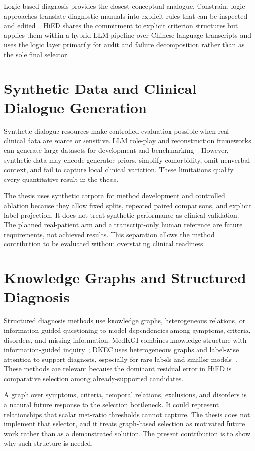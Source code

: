 Logic-based diagnosis provides the closest conceptual analogue. Constraint-logic approaches translate diagnostic manuals into explicit rules that can be inspected and edited~\citep{kim2025clp}. HiED shares the commitment to explicit criterion structures but applies them within a hybrid LLM pipeline over Chinese-language transcripts and uses the logic layer primarily for audit and failure decomposition rather than as the sole final selector.

\section{Synthetic Data and Clinical Dialogue Generation}

Synthetic dialogue resources make controlled evaluation possible when real clinical data are scarce or sensitive. LLM role-play and reconstruction frameworks can generate large datasets for development and benchmarking~\citep{wu2024callm}. However, synthetic data may encode generator priors, simplify comorbidity, omit nonverbal context, and fail to capture local clinical variation. These limitations qualify every quantitative result in the thesis.

The thesis uses synthetic corpora for method development and controlled ablation because they allow fixed splits, repeated paired comparisons, and explicit label projection. It does not treat synthetic performance as clinical validation. The planned real-patient arm and a transcript-only human reference are future requirements, not achieved results. This separation allows the method contribution to be evaluated without overstating clinical readiness.

\section{Knowledge Graphs and Structured Diagnosis}

Structured diagnosis methods use knowledge graphs, heterogeneous relations, or information-guided questioning to model dependencies among symptoms, criteria, disorders, and missing information. MedKGI combines knowledge structure with information-guided inquiry~\citep{wang2025medkgi}; DKEC uses heterogeneous graphs and label-wise attention to support diagnosis, especially for rare labels and smaller models~\citep{ge2024dkec}. These methods are relevant because the dominant residual error in HiED is comparative selection among already-supported candidates.

A graph over symptoms, criteria, temporal relations, exclusions, and disorders is a natural future response to the selection bottleneck. It could represent relationships that scalar met-ratio thresholds cannot capture. The thesis does not implement that selector, and it treats graph-based selection as motivated future work rather than as a demonstrated solution. The present contribution is to show why such structure is needed.

